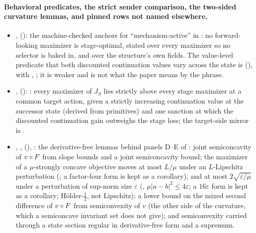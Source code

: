 \paragraph{Behavioral predicates, the strict sender comparison, the
two-sided curvature lemmas, and pinned rows not named elsewhere.}
\begin{itemize}[leftmargin=1.4em,itemsep=1pt]
\item {},  (): the machine-checked anchors for ``mechanism-active'' in : no forward-looking maximizer is stage-optimal, stated over every maximizer so no selector is baked in, and over the structure's own fields. The value-level predicate that both discounted continuation values vary across the state is  (), with , ; it is weaker and is not what the paper means by the phrase.
\item {},  (): : every maximizer of $J_S$ lies strictly above every stage maximizer at a common target action, given a strictly increasing continuation value at the successor state (derived from primitives) and one sanction at which the discounted continuation gain outweighs the stage loss; the target-side mirror is .
\item {}, ,  (), : the derivative-free lemmas behind panels D--E of : joint semiconcavity of $v\circ F$ from slope bounds and a joint semiconcavity bound; the maximizer of a $\mu$-strongly concave objective moves at most $L/\mu$ under an $L$-Lipschitz perturbation (; a factor-four form is kept as a corollary), and at most $2\sqrt{\varepsilon/\mu}$ under a perturbation of sup-norm size $\varepsilon$ (, $\mu|a-b|^2\le4\varepsilon$; a $16\varepsilon$ form is kept as a corollary; H\"older-$\tfrac12$, not Lipschitz); a lower bound on the mixed second difference of $v\circ F$ from semiconvexity of $v$ (the other side of the curvature, which a semiconcave invariant set does not give); and semiconvexity carried through a state section regular in derivative-free form and a supremum.

\end{itemize}
